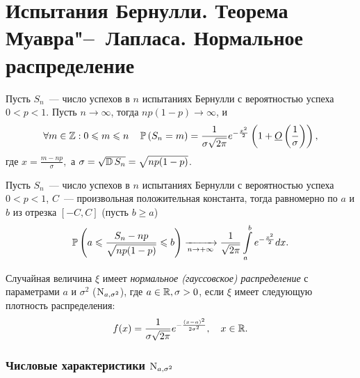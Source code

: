 \section{Испытания Бернулли. Теорема Муавра"--~Лапласа. Нормальное распределение}

\begin{namedthm} 
    Пусть $S_n$~--- число успехов в $n$ испытаниях Бернулли с вероятностью успеха $0 < p < 1$. 
    Пусть $n \to \infty$, тогда $n p(1-p) {\longrightarrow} \infty$, и 
    \begin{equation*}
        \forall m \in \mathbb{Z}: 0 \leqslant m \leqslant n \quad \operatorname{\mathbb{P}}\left(S_{n}=m\right)=\frac{1}{\sigma \sqrt{2 \pi} } e^{-\frac{x^{2}}{2}}\left(1+\underline{O}\left(\frac{1}{\sigma}\right)\right),
    \end{equation*}
    где $x = \frac{m - np}{\sigma},$ а $\sigma=\sqrt{\operatorname{\mathbb{D}} S_{n}}=\sqrt{n p(1-p)}$.
\end{namedthm}  

\begin{namedthm}
    Пусть $S_n$~--- число успехов в $n$ испытаниях Бернулли с вероятностью успеха $0 < p < 1$, $C$~--- произвольная положительная константа, тогда равномерно по $a$ и $b$ из отрезка $[-C,C]$ (пусть $b \geqslant a$)
\begin{equation*}
    \operatorname{\mathbb{P}}\left(a \leqslant \frac{S_{n}-n p}{\sqrt{n p(1-p)}} \leqslant b\right) \xrightarrow[n \to +\infty]{} \frac{1}{\sqrt{2 \pi}} \int\limits_{a}^{b} e^{-\frac{x^{2}}{2}} dx.
\end{equation*}
\end{namedthm} 

\begin{defn}
    Случайная величина $\xi$ имеет \textit{нормальное (гауссовское) распределение} с параметрами $a$ и $\sigma^2$ ($\operatorname{\mathrm{N}}_{a, \sigma^2}$), где $a \in \mathbb{R}, \sigma > 0$, если $\xi$ имеет следующую плотность распределения: 
\begin{equation*}
    f(x)=\frac{1}{\sigma \sqrt{2 \pi}} e^{-\frac{(x-a)^{2}}{2 \sigma^{2}}}, \quad x \in \mathbb{R}.
\end{equation*}
\end{defn}

\subsubsection{Числовые характеристики $\operatorname{\mathrm{N}}_{a, \sigma^2}$}


